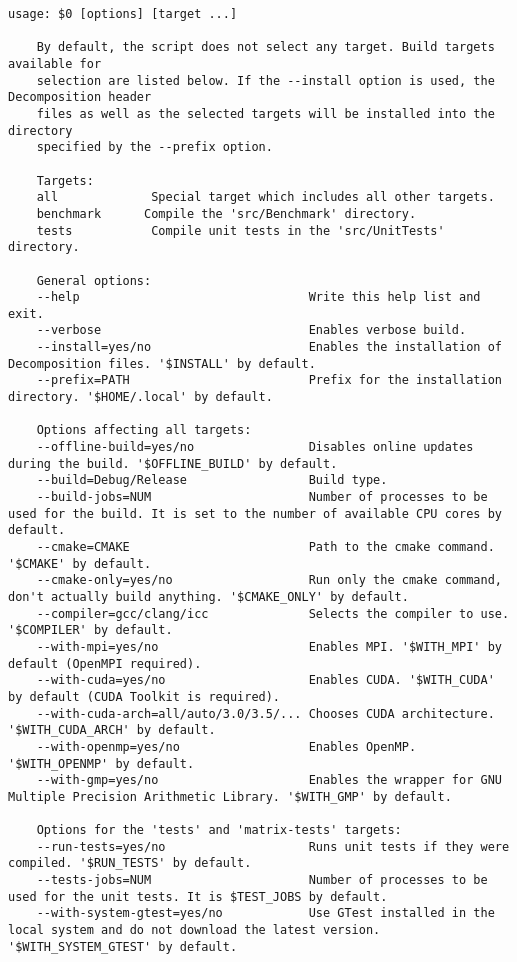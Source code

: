 \begin{lstlisting}[language={},caption={Decomposition project's \code{build} script usage. Taken from the Decomposition project repository on GitLab\protect\footref{Footnote:decomposition-project-gitlab-url}.},label={Listing:decomposition-project-build-script-usage}]
	usage: $0 [options] [target ...]
		
	By default, the script does not select any target. Build targets available for
	selection are listed below. If the --install option is used, the Decomposition header
	files as well as the selected targets will be installed into the directory
	specified by the --prefix option.
	
	Targets:
	all             Special target which includes all other targets.
	benchmark      Compile the 'src/Benchmark' directory.
	tests           Compile unit tests in the 'src/UnitTests' directory.
	
	General options:
	--help                                Write this help list and exit.
	--verbose                             Enables verbose build.
	--install=yes/no                      Enables the installation of Decomposition files. '$INSTALL' by default.
	--prefix=PATH                         Prefix for the installation directory. '$HOME/.local' by default.
	
	Options affecting all targets:
	--offline-build=yes/no                Disables online updates during the build. '$OFFLINE_BUILD' by default.
	--build=Debug/Release                 Build type.
	--build-jobs=NUM                      Number of processes to be used for the build. It is set to the number of available CPU cores by default.
	--cmake=CMAKE                         Path to the cmake command. '$CMAKE' by default.
	--cmake-only=yes/no                   Run only the cmake command, don't actually build anything. '$CMAKE_ONLY' by default.
	--compiler=gcc/clang/icc              Selects the compiler to use. '$COMPILER' by default.
	--with-mpi=yes/no                     Enables MPI. '$WITH_MPI' by default (OpenMPI required).
	--with-cuda=yes/no                    Enables CUDA. '$WITH_CUDA' by default (CUDA Toolkit is required).
	--with-cuda-arch=all/auto/3.0/3.5/... Chooses CUDA architecture. '$WITH_CUDA_ARCH' by default.
	--with-openmp=yes/no                  Enables OpenMP. '$WITH_OPENMP' by default.
	--with-gmp=yes/no                     Enables the wrapper for GNU Multiple Precision Arithmetic Library. '$WITH_GMP' by default.
	
	Options for the 'tests' and 'matrix-tests' targets:
	--run-tests=yes/no                    Runs unit tests if they were compiled. '$RUN_TESTS' by default.
	--tests-jobs=NUM                      Number of processes to be used for the unit tests. It is $TEST_JOBS by default.
	--with-system-gtest=yes/no            Use GTest installed in the local system and do not download the latest version. '$WITH_SYSTEM_GTEST' by default.
\end{lstlisting}




